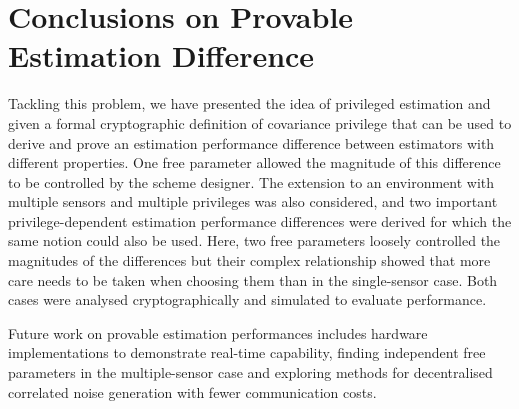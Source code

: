\section{Conclusions on Provable Estimation Difference}\label{sec:priv_estimation:conclusion}
Tackling this problem, we have presented the idea of privileged estimation and given a formal cryptographic definition of covariance privilege that can be used to derive and prove an estimation performance difference between estimators with different properties. One free parameter allowed the magnitude of this difference to be controlled by the scheme designer. The extension to an environment with multiple sensors and multiple privileges was also considered, and two important privilege-dependent estimation performance differences were derived for which the same notion could also be used. Here, two free parameters loosely controlled the magnitudes of the differences but their complex relationship showed that more care needs to be taken when choosing them than in the single-sensor case. Both cases were analysed cryptographically and simulated to evaluate performance.

Future work on provable estimation performances includes hardware implementations to demonstrate real-time capability, finding independent free parameters in the multiple-sensor case and exploring methods for decentralised correlated noise generation with fewer communication costs.